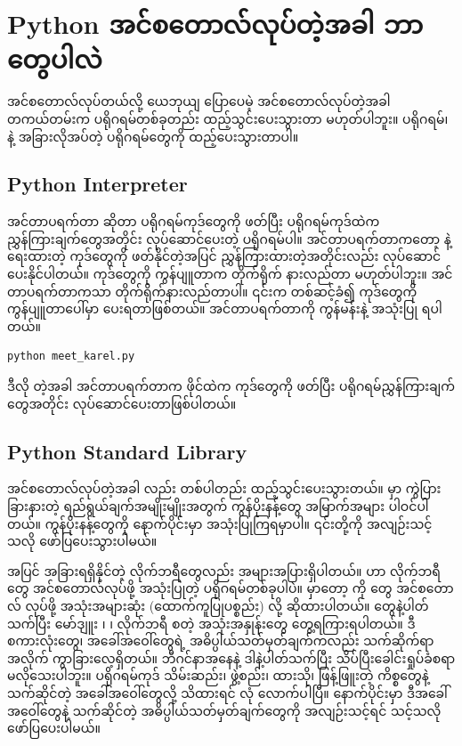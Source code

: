 \section{Python အင်စတောလ်လုပ်တဲ့အခါ ဘာတွေပါလဲ}
 အင်စတောလ်လုပ်တယ်လို့ ယေဘုယျ ပြောပေမဲ့  အင်စတောလ်လုပ်တဲ့အခါ တကယ်တမ်းက ပရိုဂရမ်တစ်ခုတည်း ထည့်သွင်းပေးသွားတာ မဟုတ်ပါဘူး။   ပရိုဂရမ်၊   နဲ့ အခြားလိုအပ်တဲ့ ပရိုဂရမ်တွေကို ထည့်ပေးသွားတာပါ။ 
\subsection*{Python Interpreter}
အင်တာပရက်တာ ဆိုတာ ပရိုဂရမ်ကုဒ်တွေကို ဖတ်ပြီး ပရိုဂရမ်ကုဒ်ထဲက ညွှန်ကြားချက်တွေအတိုင်း လုပ်ဆောင်ပေးတဲ့ ပရိုဂရမ်ပါ။  အင်တာပရက်တာကတော့  နဲ့ရေးထားတဲ့ ကုဒ်တွေကို ဖတ်နိုင်တဲ့အပြင် ညွှန်ကြားထားတဲ့အတိုင်းလည်း လုပ်ဆောင်ပေးနိုင်ပါတယ်။  ကုဒ်တွေကို ကွန်ပျူတာက တိုက်ရိုက် နားလည်တာ မဟုတ်ပါဘူး။ အင်တာပရက်တာကသာ တိုက်ရိုက်နားလည်တာပါ။ ၎င်းက တစ်ဆင့်ခံ၍  ကုဒ်တွေကို ကွန်ပျူတာပေါ်မှာ  ပေးရတာဖြစ်တယ်။ အင်တာပရက်တာကို  ကွန်မန်းနဲ့ အသုံးပြု  ရပါတယ်။
%
\begin{verbatim}
python meet_karel.py
\end{verbatim}
%
ဒီလို  တဲ့အခါ  အင်တာပရက်တာက  ဖိုင်ထဲက ကုဒ်တွေကို ဖတ်ပြီး ပရိုဂရမ်ညွှန်ကြား\allowbreak ချက်တွေအတိုင်း လုပ်ဆောင်ပေးတာဖြစ်ပါတယ်။

\subsection*{Python Standard Library}
 အင်စတောလ်လုပ်တဲ့အခါ  လည်း တစ်ပါတည်း ထည့်သွင်းပေးသွားတယ်။  မှာ ကွဲပြားခြားနားတဲ့ ရည်ရွယ်ချက်အမျိုးမျိုးအတွက် ကွန်ပိုးနန့်တွေ အမြာက်အများ ပါဝင်ပါတယ်။  ကွန်ပိုးနန့်တွေကို နောက်ပိုင်းမှာ အသုံးပြုကြရမှာပါ။ ၎င်းတို့ကို အ\allowbreak လျဉ်းသင့်သလို ဖော်ပြပေးသွားပါမယ်။

 အပြင် အခြားရရှိနိုင်တဲ့ လိုက်ဘရီတွေလည်း အများအပြားရှိပါတယ်။  ဟာ လိုက်ဘရီတွေ  အင်စတောလ်လုပ်ဖို့ အသုံးပြုတဲ့ ပရိုဂရမ်တစ်ခုပါပဲ။  မှာတော့  ကို  တွေ အင်စတောလ် လုပ်ဖို့ အသုံးအများဆုံး  (ထောက်ကူပြုပစ္စည်း) လို့ ဆိုထားပါတယ်။  တွေနဲ့ပါတ်သက်ပြီး မော်ဒျူး ၊  ၊ လိုက်ဘရီ  စတဲ့ အသုံးအနှုန်းတွေ တွေ့ရကြားရပါတယ်။ ဒီစကားလုံးတွေ၊ အခေါ်အဝေါ်တွေရဲ့ အဓိပ္ပါယ်သတ်မှတ်ချက်ကလည်း သက်ဆိုက်ရာ  အလိုက် ကွာ\allowbreak ခြားလေ့ရှိတယ်။ ဘီဂင်နာအနေနဲ့ ဒါနဲ့ပါတ်သက်ပြီး သိပ်ပြီးခေါင်းရှုပ်ခံစရာ မလိုသေးပါဘူး။ ပရိုဂရမ်ကုဒ် သိမ်းဆည်း၊ ဖွဲ့စည်း၊ ထားသို၊ ဖြန့်ဖြူးတဲ့ ကိစ္စတွေနဲ့ သက်ဆိုင်တဲ့ အခေါ်အဝေါ်တွေလို့ သိထားရင် လုံ \allowbreak လောက်ပါပြီ။ နောက်ပိုင်းမှာ ဒီအခေါ်အဝေါ်တွေနဲ့ သက်ဆိုင်တဲ့ အဓိပ္ပါယ်သတ်မှတ်ချက်တွေကို အ\allowbreak  လျဉ်း\allowbreak သင့်ရင် သင့်သလို ဖော်ပြပေးပါမယ်။



